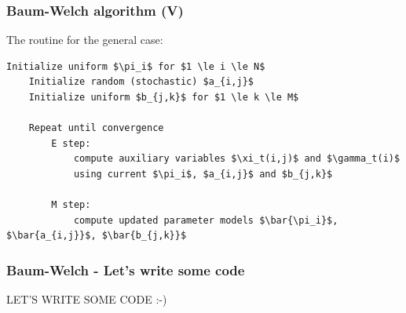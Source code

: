 \begin{frame}[fragile, t]
	\frametitle{Baum-Welch algorithm (V)}
	The routine for the general case:
	\vspace*{1em}
	\lstset{columns=fullflexible, 
			basicstyle=\footnotesize, 
			numbers=left, 
			stepnumber=1, 
			numbersep=5pt,
			title=Baum-Welch Iterative Update,
			frame=single,
			xleftmargin=1em,
			captionpos=b}	

	\begin{lstlisting}[mathescape]
    Initialize uniform $\pi_i$ for $1 \le i \le N$
    Initialize random (stochastic) $a_{i,j}$
    Initialize uniform $b_{j,k}$ for $1 \le k \le M$
	
    Repeat until convergence
        E step:
            compute auxiliary variables $\xi_t(i,j)$ and $\gamma_t(i)$ 
            using current $\pi_i$, $a_{i,j}$ and $b_{j,k}$
        
        M step:
            compute updated parameter models $\bar{\pi_i}$, $\bar{a_{i,j}}$, $\bar{b_{j,k}}$
	\end{lstlisting}

\end{frame}

\begin{frame}
	\frametitle{Baum-Welch - Let's write some code}
	\centering
	LET'S WRITE SOME CODE :-)
\end{frame}